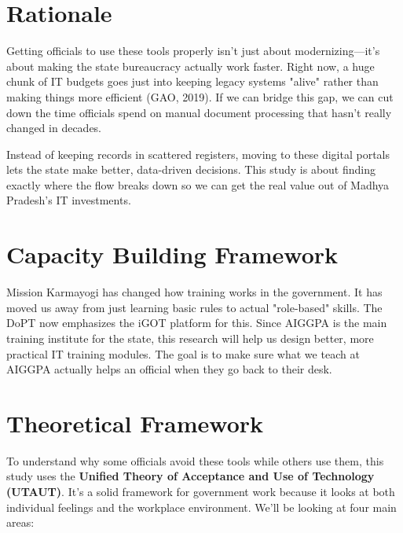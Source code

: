 \documentclass[11pt,a4paper]{article}
\begin{document}
\section{Rationale}

\vspace{0.2cm}

Getting officials to use these tools properly isn't just about modernizing—it's 
about making the state bureaucracy actually work faster. Right now, a huge 
chunk of IT budgets goes just into keeping legacy systems "alive" rather than 
making things more efficient (GAO, 2019). If we can bridge this gap, we can 
cut down the time officials spend on manual document processing that hasn't 
really changed in decades.

Instead of keeping records in scattered registers, moving to these digital 
portals lets the state make better, data-driven decisions. This study is about 
finding exactly where the flow breaks down so we can get the real value out 
of Madhya Pradesh's IT investments.

\section{Capacity Building Framework}

\vspace{0.2cm}

Mission Karmayogi has changed how training works in the government. It has moved us 
away from just learning basic rules to actual "role-based" skills. The DoPT 
now emphasizes the iGOT platform for this. Since AIGGPA is the main 
training institute for the state, this research will help us design better, 
more practical IT training modules. The goal is to make sure what we teach 
at AIGGPA actually helps an official when they go back to their desk.

\section{Theoretical Framework}

\vspace{0.2cm}

To understand why some officials avoid these tools while others use them, this 
study uses the \textbf{Unified Theory of Acceptance and Use of Technology (UTAUT)}. 
It's a solid framework for government work because it looks at both individual 
feelings and the workplace environment. We'll be looking at four main areas:
\end{document}
